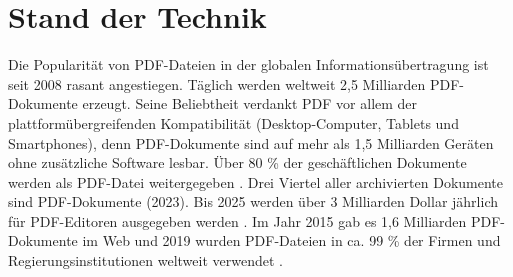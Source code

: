\chapter{Stand der Technik}
Die Popularität von PDF-Dateien in der globalen Informationsübertragung ist seit 2008 rasant angestiegen. Täglich werden weltweit 2,5 Milliarden PDF-Dokumente erzeugt. Seine Beliebtheit verdankt PDF vor allem der plattformübergreifenden Kompatibilität (Desktop-Computer, Tablets und Smartphones), denn PDF-Dokumente sind auf mehr als 1,5 Milliarden Geräten ohne zusätzliche Software lesbar. Über 80 \% der geschäftlichen Dokumente werden als PDF-Datei weitergegeben \cite{formilo}. Drei Viertel aller archivierten Dokumente sind PDF-Dokumente (2023). Bis 2025 werden über 3 Milliarden Dollar jährlich für PDF-Editoren ausgegeben werden \cite{kofax}. Im Jahr 2015 gab es 1,6 Milliarden PDF-Dokumente im Web und 2019 wurden PDF-Dateien in ca. 99 \% der Firmen und Regierungsinstitutionen weltweit verwendet \cite{ccc-break-pdf}.










